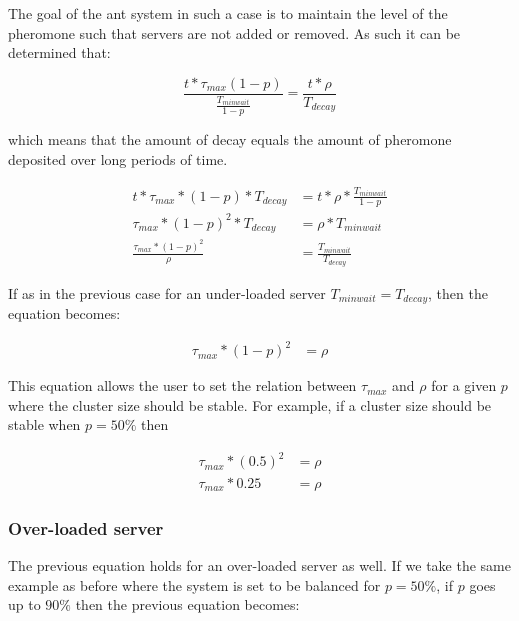 The goal of the ant system in such a case is to maintain the level of the pheromone such that servers are not added or removed. As such it can be determined that:

\begin{equation}
\frac{t *  \tau_{max}(1 - p)}{\frac{T_{minwait}}{1 - p}} = \frac{t *  \rho}{T_{decay}}
\end{equation}

which means that the amount of decay equals the amount of pheromone deposited over long periods of time.

\begin{equation}
\begin{aligned}
t *  \tau_{max} * (1 - p) * T_{decay} &= t *  \rho * \frac{T_{minwait}}{1 - p} \\
\tau_{max} * (1 - p)^2 * T_{decay} &= \rho * T_{minwait} \\
\frac{\tau_{max} * (1 - p)^2}{\rho} &= \frac{T_{minwait}}{T_{decay}}
\end{aligned}
\end{equation}

If as in the previous case for an under-loaded server $T_{minwait} = T_{decay}$, then the equation becomes:

\begin{equation}
\begin{aligned}
\tau_{max} * (1 - p)^2 &= \rho
\end{aligned}
\end{equation}

This equation allows the user to set the relation between $\tau_{max}$ and $\rho$ for a given $p$ where the cluster size should be stable. For example, if a cluster size should be stable when $p = 50\%$ then

\begin{equation}
\begin{aligned}
\tau_{max} * (0.5)^2 &= \rho \\
\tau_{max} * 0.25 &= \rho
\end{aligned}
\end{equation}

\subsubsection{Over-loaded server}

The previous equation holds for an over-loaded server as well. If we take the same example as before where the system is set to be balanced for $p = 50\%$, if $p$ goes up to $90\%$ then the previous equation becomes:

